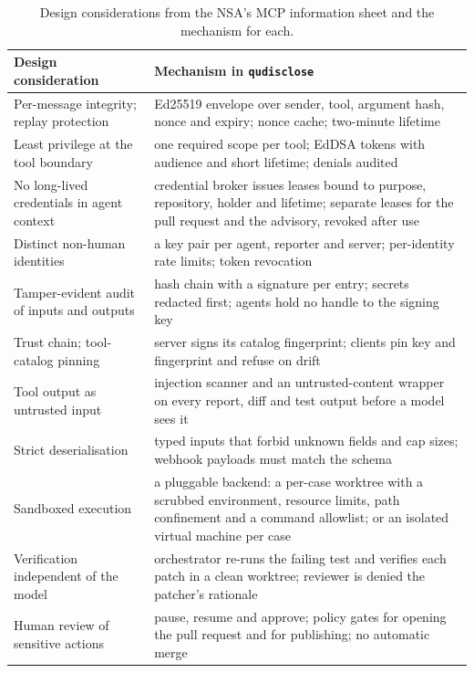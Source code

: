 \documentclass[11pt]{article}
\newcommand{\qud}{\texttt{qudisclose}}
\begin{document}
\begin{table}[t]
\centering\footnotesize
\begin{tabular}{@{}>{\raggedright\arraybackslash}p{}>{\raggedright\arraybackslash}p{}@{}}
\toprule
Design consideration & Mechanism in \qud{} \\
\midrule
Per-message integrity; replay protection & Ed25519 envelope over sender, tool, argument hash, nonce and expiry; nonce cache; two-minute lifetime \\
Least privilege at the tool boundary & one required scope per tool; EdDSA tokens with audience and short lifetime; denials audited \\
No long-lived credentials in agent context & credential broker issues leases bound to purpose, repository, holder and lifetime; separate leases for the pull request and the advisory, revoked after use \\
Distinct non-human identities & a key pair per agent, reporter and server; per-identity rate limits; token revocation \\
Tamper-evident audit of inputs and outputs & hash chain with a signature per entry; secrets redacted first; agents hold no handle to the signing key \\
Trust chain; tool-catalog pinning & server signs its catalog fingerprint; clients pin key and fingerprint and refuse on drift \\
Tool output as untrusted input & injection scanner and an untrusted-content wrapper on every report, diff and test output before a model sees it \\
Strict deserialisation & typed inputs that forbid unknown fields and cap sizes; webhook payloads must match the schema \\
Sandboxed execution & a pluggable backend: a per-case worktree with a scrubbed environment, resource limits, path confinement and a command allowlist; or an isolated virtual machine per case \\
Verification independent of the model & orchestrator re-runs the failing test and verifies each patch in a clean worktree; reviewer is denied the patcher's rationale \\
Human review of sensitive actions & pause, resume and approve; policy gates for opening the pull request and for publishing; no automatic merge \\
\bottomrule
\end{tabular}
\caption{Design considerations from the NSA's MCP information sheet and the mechanism for each.}
\label{tab:controls}
\end{table}
\end{document}
